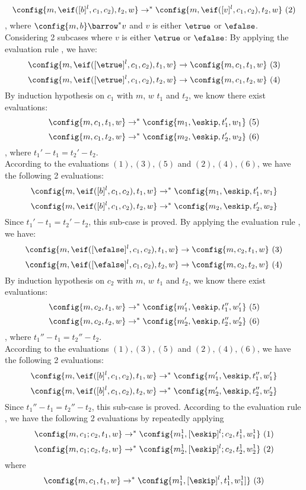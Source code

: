 {\begin{subproof}
\[\]
%
\[
\config{m, \eif([b]^l, c_1, c_2), t_2, w} \to^{*} \config{m, \eif([v]^l, c_1, c_2), t_2, w} ~ (2)
\]
%
, where $\config{m, b} \barrow^{*} v$ and $v$ is either $\etrue$ or $\efalse$.
\\
Considering 2 subcases where $v$ is either $\etrue$ or $\efalse$:
%
%
By applying the evaluation rule , we have:
\[
\config{m, \eif([\etrue]^l, c_1, c_2), t_1, w} \to \config{m, c_1, t_1, w} ~ (3)
\]
%
\[
\config{m, \eif([\etrue]^l, c_1, c_2), t_2, w} \to \config{m, c_1, t_2, w} ~ (4)
\]
%
By induction hypothesis on $c_1$ with $m$, $w$ $t_1$ and $t_2$, we know there exist evaluations:
\[
	\config{m, c_1, t_1, w} \to^{*} \config{m_1, \eskip, t_1', w_1} ~ (5)
\]
%
\[
	\config{m, c_1, t_2, w} \to^{*} \config{m_2, \eskip, t_2', w_2} ~ (6)
\]
%
, where $t_1' - t_1 = t_2' - t_2$.
\\
According to the evaluations $(1), (3), (5)$ and $(2), (4), (6)$, we have the following 2 evaluations:
% 
\[
	\config{m, \eif([b]^l, c_1, c_2), t_1, w} \to^{*} \config{m_1, \eskip, t_1', w_1}
\]
%
\[
	\config{m, \eif([b]^l, c_1, c_2), t_2, w} \to^{*} \config{m_2, \eskip, t_2', w_2}
\]
%
Since $t_1' - t_1 = t_2' - t_2$, this sub-case is proved.
%
%
By applying the evaluation rule , we have:
%
\[
\config{m, \eif([\efalse]^l, c_1, c_2), t_1, w} \to \config{m, c_2, t_1, w} ~ (3)
\]
%
\[
\config{m, \eif([\efalse]^l, c_1, c_2), t_2, w} \to \config{m, c_2, t_2, w} ~ (4)
\]
%
By induction hypothesis on $c_2$ with $m$, $w$ $t_1$ and $t_2$, we know there exist evaluations:
\[
	\config{m, c_2, t_1, w} \to^{*} \config{m_1', \eskip, t_1'', w_1'} ~ (5)
\]
%
\[
	\config{m, c_2, t_2, w} \to^{*} \config{m_2', \eskip, t_2'', w_2'} ~ (6)
\]
%
, where $t_1'' - t_1 = t_2'' - t_2$.
\\
According to the evaluations $(1), (3), (5)$ and $(2), (4), (6)$, we have the following 2 evaluations:
% 
\[
	\config{m, \eif([b]^l, c_1, c_2), t_1, w} \to^{*} \config{m_1', \eskip, t_1'', w_1'}
\]
%
\[
	\config{m, \eif([b]^l, c_1, c_2), t_2, w} \to^{*} \config{m_2', \eskip, t_2'', w_2'}
\]
%
Since $t_1'' - t_1 = t_2'' - t_2$, this sub-case is proved.
%
%
According to the evaluation rule , we have the following 2 evaluations by repeatedly applying  
%
\[
\config{m, c_1;c_2, t_1, w} \to^{*} \config{m_1^1, [\eskip]^l;c_2,  t_1^1, w_1^1} ~ (1)
\]
%
%
\[
\config{m, c_1;c_2, t_2, w} \to^{*} \config{m_2^1, [\eskip]^l;c_2,  t_2^1, w_2^1} ~ (2)
\]
%
where 
%
\[
	\config{m, c_1, t_1, w} \to^{*} \config{m_1^1, [\eskip]^l, t_1^1, w_1^1]} ~ (3)
\]
\end{subproof}}
